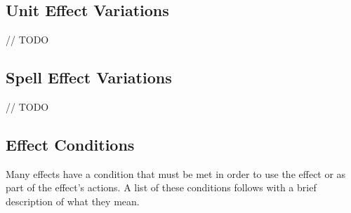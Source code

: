 \subsection{Unit Effect Variations}
// TODO

\subsection{Spell Effect Variations}
// TODO


\subsection{Effect Conditions}
Many effects have a condition that must be met in order to use the effect or as part of the effect's actions. A list of these conditions follows with a brief description of what they mean.
